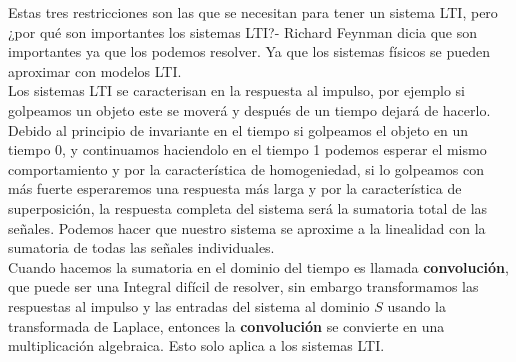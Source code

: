 \documentclass[
	12pt, %
]{fphw}
\begin{document}
Estas tres restricciones son las que se necesitan para tener un sistema LTI, pero ¿por qué son importantes los sistemas LTI?- Richard Feynman dicia que son importantes ya que los podemos resolver. Ya que los sistemas físicos se pueden aproximar con modelos LTI.\\

Los sistemas LTI se caracterisan en la respuesta al impulso, por ejemplo si golpeamos un objeto este se moverá y después de un tiempo dejará de hacerlo. Debido al principio de invariante en el tiempo si golpeamos el objeto en un tiempo 0, y continuamos haciendolo en el tiempo 1 podemos esperar el mismo comportamiento y por la característica de homogeniedad, si lo golpeamos con más fuerte esperaremos una respuesta más larga y por la característica de superposición, la respuesta completa del sistema será la sumatoria total de las señales. Podemos hacer que nuestro sistema se aproxime a la linealidad con la sumatoria de todas las señales individuales.\\

Cuando hacemos la sumatoria en el dominio del tiempo es llamada \textbf{convolución}, que puede ser una Integral difícil de resolver, sin embargo transformamos las respuestas al impulso y las entradas del sistema al dominio $S$ usando la transformada de Laplace, entonces la \textbf{convolución} se convierte en una multiplicación algebraica. Esto solo aplica a los sistemas LTI.
\end{document}
